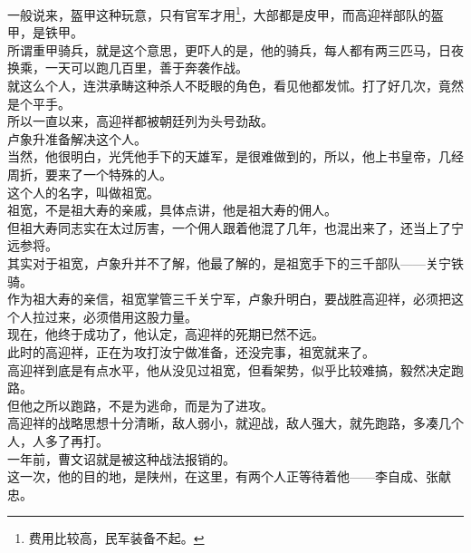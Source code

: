 \begin{multicols}{\theparacolNo}
一般说来，盔甲这种玩意，只有官军才用\footnote{费用比较高，民军装备不起。}，大部都是皮甲，而高迎祥部队的盔甲，是铁甲。\\

所谓重甲骑兵，就是这个意思，更吓人的是，他的骑兵，每人都有两三匹马，日夜换乘，一天可以跑几百里，善于奔袭作战。\\

就这么个人，连洪承畴这种杀人不眨眼的角色，看见他都发怵。打了好几次，竟然是个平手。\\

所以一直以来，高迎祥都被朝廷列为头号劲敌。\\

卢象升准备解决这个人。\\

当然，他很明白，光凭他手下的天雄军，是很难做到的，所以，他上书皇帝，几经周折，要来了一个特殊的人。\\

这个人的名字，叫做祖宽。\\

祖宽，不是祖大寿的亲戚，具体点讲，他是祖大寿的佣人。\\

但祖大寿同志实在太过厉害，一个佣人跟着他混了几年，也混出来了，还当上了宁远参将。\\

其实对于祖宽，卢象升并不了解，他最了解的，是祖宽手下的三千部队——关宁铁骑。\\

作为祖大寿的亲信，祖宽掌管三千关宁军，卢象升明白，要战胜高迎祥，必须把这个人拉过来，必须借用这股力量。\\

现在，他终于成功了，他认定，高迎祥的死期已然不远。\\

此时的高迎祥，正在为攻打汝宁做准备，还没完事，祖宽就来了。\\

高迎祥到底是有点水平，他从没见过祖宽，但看架势，似乎比较难搞，毅然决定跑路。\\

但他之所以跑路，不是为逃命，而是为了进攻。\\

高迎祥的战略思想十分清晰，敌人弱小，就迎战，敌人强大，就先跑路，多凑几个人，人多了再打。\\

一年前，曹文诏就是被这种战法报销的。\\

这一次，他的目的地，是陕州，在这里，有两个人正等待着他——李自成、张献忠。\\


\end{multicols}
